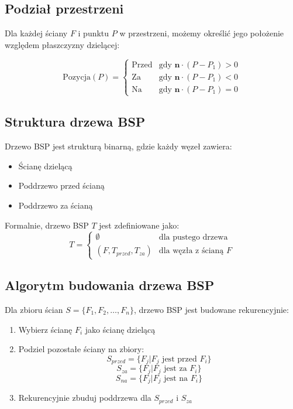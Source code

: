 \documentclass[a4paper,12pt]{article}
\begin{document}
\subsection{Podział przestrzeni}

Dla każdej ściany \(F\) i punktu \(P\) w przestrzeni, możemy określić jego położenie względem płaszczyzny dzielącej:

\[
\text{Pozycja}(P) = \begin{cases}
\text{Przed} & \text{gdy } \mathbf{n} \cdot (P - P_1) > 0 \\
\text{Za} & \text{gdy } \mathbf{n} \cdot (P - P_1) < 0 \\
\text{Na} & \text{gdy } \mathbf{n} \cdot (P - P_1) = 0
\end{cases}
\]

\subsection{Struktura drzewa BSP}

Drzewo BSP jest strukturą binarną, gdzie każdy węzeł zawiera:
\begin{itemize}
    \item Ścianę dzielącą
    \item Poddrzewo przed ścianą
    \item Poddrzewo za ścianą
\end{itemize}

Formalnie, drzewo BSP \(T\) jest zdefiniowane jako:
\[
T = \begin{cases}
\emptyset & \text{dla pustego drzewa} \\
(F, T_{przed}, T_{za}) & \text{dla węzła z ścianą } F
\end{cases}
\]

\subsection{Algorytm budowania drzewa BSP}

Dla zbioru ścian \(S = \{F_1, F_2, \ldots, F_n\}\), drzewo BSP jest budowane rekurencyjnie:

\begin{enumerate}
    \item Wybierz ścianę \(F_i\) jako ścianę dzielącą
    \item Podziel pozostałe ściany na zbiory:
    \[
    S_{przed} = \{F_j | F_j \text{ jest przed } F_i\}
    \]
    \[
    S_{za} = \{F_j | F_j \text{ jest za } F_i\}
    \]
    \[
    S_{na} = \{F_j | F_j \text{ jest na } F_i\}
    \]
    \item Rekurencyjnie zbuduj poddrzewa dla \(S_{przed}\) i \(S_{za}\)
\end{enumerate}
\end{document}
